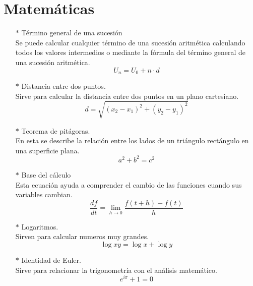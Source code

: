 \documentclass[letterpaper,pt12]{article}
\begin{document}
\section*{Matemáticas}
\begin{itemize}
\item [$\ast$]{Término general de una sucesión}\\
Se puede calcular cualquier término de una sucesión aritmética calculando todos los valores intermedios o mediante la fórmula del término general de una sucesión aritmética.
\begin{equation*}
    U_n=U_0+n\cdot d
\end{equation*}

\item[$\ast$]{Distancia entre dos puntos.}\\
Sirve para calcular la distancia entre dos puntos en un plano cartesiano.
\begin{equation*}
    d=\sqrt{(x_2-x_1)^2+(y_2-y_1)^2}
\end{equation*}

\item[$\ast$]{Teorema de pitágoras.}\\
En esta se describe la relación entre los lados de un triángulo rectángulo en una superficie plana.
\begin{equation*}
    a^2+b^2=c^2
\end{equation*}

\item[$\ast$]{Base del cálculo}\\
Esta ecuación ayuda a comprender el cambio de las funciones cuando sus variables cambian.
\begin{equation*}
    \frac{df}{dt}=\lim_{h \to 0}\frac{f(t+h)-f(t)}{h}
\end{equation*}

\item[$\ast$]{Logaritmos.}\\
Sirven para calcular numeros muy grandes.
\begin{equation*}
    \log xy=\log x+\log y
\end{equation*}

\item[$\ast$]{Identidad de Euler.}\\
Sirve para relacionar la trigonometría con el análisis matemático.
\begin{equation*}
    e^{i\pi}+1=0
\end{equation*}


\end{itemize}
\end{document}
